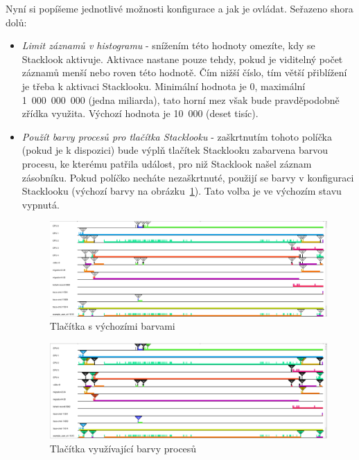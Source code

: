 Nyní si popíšeme jednotlivé možnosti konfigurace a jak je ovládat. Seřazeno shora dolů:
\begin{itemize}
  \item \emph{Limit záznamů v histogramu} - snížením této hodnoty omezíte, kdy se Stacklook aktivuje. Aktivace nastane pouze tehdy, pokud je viditelný počet záznamů menší nebo roven této hodnotě. Čím nižší číslo, tím větší přiblížení je třeba k aktivaci Stacklooku. Minimální hodnota je 0, maximální 1~000~000~000 (jedna miliarda), tato horní mez však bude pravděpodobně zřídka využita. Výchozí hodnota je 10~000 (deset tisíc).
  
  \item \emph{Použít barvy procesů pro tlačítka Stacklooku} - zaškrtnutím tohoto políčka (pokud je k dispozici) bude výplň tlačítek Stacklooku zabarvena barvou procesu, ke kterému patřila událost, pro niž Stacklook našel záznam zásobníku. Pokud políčko necháte nezaškrtnuté, použijí se barvy v konfiguraci Stacklooku (výchozí barvy na obrázku~\ref{SlDefaultColors}). Tato volba je ve výchozím stavu vypnutá.
  
  \begin{figure}[p]\centering
      \includegraphics[width=140mm]{img/Stacklook/SlDefaultColors}
      \caption{Tlačítka s výchozími barvami}
      \label{SlDefaultColors}
  \end{figure}
  
  \begin{figure}[p]\centering
      \includegraphics[width=140mm]{img/Stacklook/SlTaskColors}
      \caption{Tlačítka využívající barvy procesů}
      \label{SlTaskColors}
  \end{figure}


\end{itemize}
